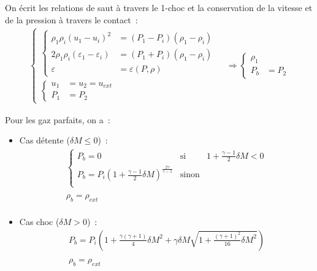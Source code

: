 \begin{enumerate}
On écrit les relations de saut à travers le 1-choc
et la conservation de la vitesse et de la pression à travers le contact~:
\begin{equation}
\begin{aligned}
\left\{
\begin{aligned}
\left\{
\begin{aligned}
\rho_1 \rho_i (u_1 - u_i)^2
&= (P_1 - P_i)(\rho_1 - \rho_i)\\[0.5em]
2\rho_1 \rho_i (\varepsilon_1 - \varepsilon_i)
&= (P_1 + P_i)(\rho_1 - \rho_i)\\[0.5em]
\varepsilon &= \varepsilon(P,\rho)
\end{aligned}
\right.\\[1em]
\left\{
\begin{aligned}
u_1 &= u_2 = u_{ext}\\[0.5em]
P_1 &= P_2
\end{aligned}
\right.
\end{aligned}
\right.
&\Rightarrow
\left\{
\begin{aligned}
\rho_1\\[0.5em]
P_b &= P_2
\end{aligned}
\right.
\end{aligned}
\end{equation}

\bigskip
Pour les gaz parfaits, on a~:

\begin{itemize}

\item Cas détente ($\delta M \leqslant 0$)~:\\
$$
\begin{array}{l}
\left\{\begin{array}{lll}
P_b=0 & \text{si} & 1 + \displaystyle\frac{\gamma-1}{2}\delta M<0\\
P_b = P_i \left(1 + \displaystyle\frac{\gamma-1}{2}\delta M\right)
^{\frac{2\gamma}{\gamma-1}} & \text{sinon}\\
\end{array}\right.\\
\\
\rho_b= \rho_{ext}\\
\end{array}
$$

\item Cas choc ($\delta M > 0$)~:\\
$$
\begin{array}{l}
P_b = P_i \left(1 + \displaystyle\frac{\gamma(\gamma+1)}{4}\delta M^2
+\gamma \delta M \displaystyle\sqrt{1+\displaystyle\frac{(\gamma+1)^2}{16}\delta M^2}\right)
\\
\\
\rho_b=\rho_{ext}\\
\end{array}
$$

\end{itemize}

\end{enumerate}


